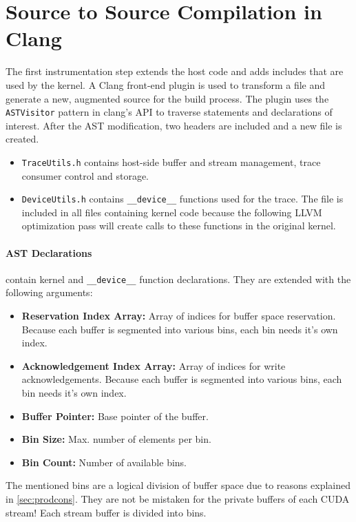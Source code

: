 \section{Source to Source Compilation in Clang}\label{sec:impl:clang}
The first instrumentation step extends the host code and adds includes that are used by the kernel. A Clang front-end
plugin is used to transform a file and generate a new, augmented source for the build process. The plugin uses the \verb|ASTVisitor| pattern in clang's API to traverse statements and declarations of interest.
After the AST modification, two headers are included and a new file is created. \cite{front-end}

\begin{itemize}
	\item \verb|TraceUtils.h| contains host-side buffer and stream management, trace consumer control and storage.
	\item \verb|DeviceUtils.h| contains \verb|__device__| functions used for the trace. The file is included in all
	files containing kernel code because the following LLVM optimization pass will create calls to these functions in the original kernel.
\end{itemize}

\paragraph{AST Declarations} contain kernel and \verb|__device__| function declarations. They are extended with the following arguments:
\begin{itemize}
	\item \textbf{Reservation Index Array:} Array of indices for buffer space reservation. Because each buffer is segmented into various bins,
		each bin needs it's own index.
	\item \textbf{Acknowledgement Index Array:} Array of indices for write acknowledgements. Because each buffer is segmented into various bins,
	each bin needs it's own index.
	\item \textbf{Buffer Pointer:} Base pointer of the buffer.
	\item \textbf{Bin Size:} Max. number of elements per bin.
	\item \textbf{Bin Count:} Number of available bins.
\end{itemize}
The mentioned bins are a logical division of buffer space due to reasons explained in \ref{sec:prodcons}. They are not be mistaken 
for the private buffers of each CUDA stream! Each stream buffer is divided into bins.

